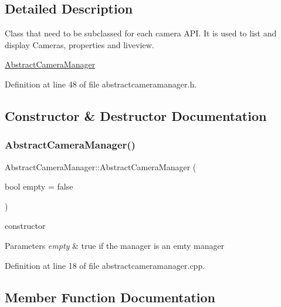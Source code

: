 \subsection{Detailed Description}
Class that need to be subclassed for each camera A\+PI. It is used to list and display Cameras, properties and liveview. 

\mbox{\hyperlink{class_abstract_camera_manager}{Abstract\+Camera\+Manager}} 

Definition at line 48 of file abstractcameramanager.\+h.



\subsection{Constructor \& Destructor Documentation}
\mbox{\label{class_abstract_camera_manager_a23be9d93959d992c91efcf1416c597ef}} 
\subsubsection{\texorpdfstring{AbstractCameraManager()}{AbstractCameraManager()}}
{\footnotesize\ttfamily Abstract\+Camera\+Manager\+::\+Abstract\+Camera\+Manager (\begin{DoxyParamCaption}\item[{bool}]{empty = {\ttfamily false} }\end{DoxyParamCaption})\hspace{0.3cm}{\ttfamily [protected]}}



constructor 


\begin{DoxyParams}{Parameters}
{\em empty} & true if the manager is an emty manager \\
\hline
\end{DoxyParams}


Definition at line 18 of file abstractcameramanager.\+cpp.



\subsection{Member Function Documentation}
\mbox{\label{class_abstract_camera_manager_aeafa7b5e2b0eb5bbc105fe6a0ee5e2f2}} 
